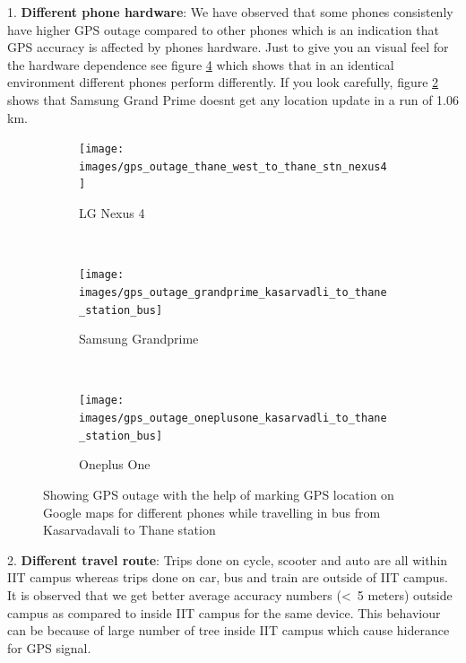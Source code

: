 \documentclass[12pt]{report}
\begin{document}
1. \textbf{Different phone hardware}: We have observed that some phones
consistenly have higher GPS outage compared to other phones which is an
indication that GPS accuracy is affected by phone\textquotesingle{}s hardware.
Just to give you an visual feel for the hardware dependence see figure
\ref{gps_outage_fig} which shows that in an identical environment different
phones perform differently. If you look carefully, figure \ref{gps_outage_gp}
shows that Samsung Grand Prime doesn\textquotesingle{}t get any location update
in a run of 1.06 km.

\begin{figure}[t!]
  \centering
  \begin{subfigure}[t]{0.33\textwidth}
    \centering
    \texttt{[image: images/gps\_outage\_thane\_west\_to\_thane\_stn\_nexus4]}
    \caption{LG Nexus 4}
    \label{gps_outage_nexus4}
  \end{subfigure}%
  ~
  \begin{subfigure}[t]{0.33\textwidth}
    \centering
    \texttt{[image: images/gps\_outage\_grandprime\_kasarvadli\_to\_thane\_station\_bus]}
    \caption{Samsung Grandprime}
    \label{gps_outage_gp}
  \end{subfigure}%
  ~
  \begin{subfigure}[t]{0.33\textwidth}
    \centering
    \texttt{[image: images/gps\_outage\_oneplusone\_kasarvadli\_to\_thane\_station\_bus]}
    \caption{Oneplus One}
    \label{gps_outage_oneplusone}
  \end{subfigure}
  \caption{Showing GPS outage with the help of marking GPS location on Google
    maps for different phones while travelling in bus from Kasarvadavali to
    Thane station}
  \label{gps_outage_fig}
\end{figure}

2. \textbf{Different travel route}: Trips done on cycle, scooter and auto are
all within IIT campus whereas trips done on car, bus and train are outside of
IIT campus. It is observed that we get better average accuracy numbers
(\textless \ 5 meters) outside campus as compared to inside IIT campus for the
same device. This behaviour can be because of large number of tree inside IIT
campus which cause hiderance for GPS signal.

\end{document}
